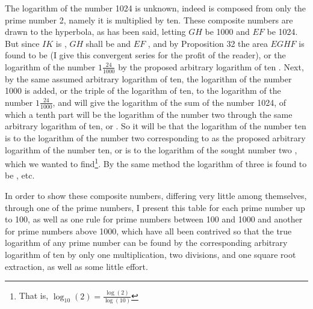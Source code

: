 \documentclass[11pt,letterpaper]{book}
\begin{document}
\noindent The logarithm of the number 1024 is unknown, indeed is composed from
only the prime number 2, namely it is multiplied by ten. These composite numbers
are drawn to the hyperbola, as has been said, letting $GH$ be 1000 and $EF$ be
1024. But since $IK$ is , $GH$ shall be
 and $EF$ , and by
Proposition 32 the area $EGHF$ is found to be
 (I give this convergent series for the
profit of the reader), or the logarithm of the number $1\frac{24}{1000}$ by the
proposed arbitrary logarithm of ten . Next,
by the same assumed arbitrary logarithm of ten, the logarithm of the number 1000
is added, or the triple of the logarithm of ten, to the logarithm of the number
$1\frac{24}{1000}$, and will give the logarithm of the sum of the number 1024,
of which a tenth part will be the logarithm of the number two through the same
arbitrary logarithm of ten, or . So it will
be that the logarithm of the number ten  is
to the logarithm of the number two corresponding to
 as the proposed arbitrary logarithm of the
number ten, or  is to the logarithm of the
sought number two , which we wanted to
find\footnote{That is, $\log_10 \left(2\right) = \frac{\log \left(2\right)}{\log
\left(10\right)}$}.
By the same method the logarithm of three is found to be
, etc.

In order to show these composite numbers, differing very little among
themselves, through one of the prime numbers, I present this table for each
prime number up to 100, as well as one rule for prime numbers between 100 and
1000 and another for prime numbers above 1000, which have all been contrived so
that the true logarithm of any prime number can be found by the corresponding
arbitrary logarithm of ten  by only one
multiplication, two divisions, and one square root extraction, as well as some
little effort.
\end{document}
